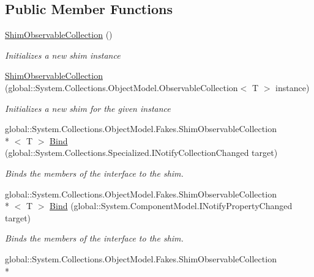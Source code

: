 \subsection*{Public Member Functions}
\begin{DoxyCompactItemize}
\item 
\hyperlink{class_system_1_1_collections_1_1_object_model_1_1_fakes_1_1_shim_observable_collection_3_01_t_01_4_ac24267859acea2bb73300f08bbcdd692}{Shim\-Observable\-Collection} ()
\begin{DoxyCompactList}\small\item\em Initializes a new shim instance\end{DoxyCompactList}\item 
\hyperlink{class_system_1_1_collections_1_1_object_model_1_1_fakes_1_1_shim_observable_collection_3_01_t_01_4_ad1fabf7b0c025f76d4309d0823675e1b}{Shim\-Observable\-Collection} (global\-::\-System.\-Collections.\-Object\-Model.\-Observable\-Collection$<$ T $>$ instance)
\begin{DoxyCompactList}\small\item\em Initializes a new shim for the given instance\end{DoxyCompactList}\item 
global\-::\-System.\-Collections.\-Object\-Model.\-Fakes.\-Shim\-Observable\-Collection\\*
$<$ T $>$ \hyperlink{class_system_1_1_collections_1_1_object_model_1_1_fakes_1_1_shim_observable_collection_3_01_t_01_4_ab09dd9abbef8fa816aa6effffb7b754e}{Bind} (global\-::\-System.\-Collections.\-Specialized.\-I\-Notify\-Collection\-Changed target)
\begin{DoxyCompactList}\small\item\em Binds the members of the interface to the shim.\end{DoxyCompactList}\item 
global\-::\-System.\-Collections.\-Object\-Model.\-Fakes.\-Shim\-Observable\-Collection\\*
$<$ T $>$ \hyperlink{class_system_1_1_collections_1_1_object_model_1_1_fakes_1_1_shim_observable_collection_3_01_t_01_4_aa47c7b90ccaaec89d8d0443cc40936d8}{Bind} (global\-::\-System.\-Component\-Model.\-I\-Notify\-Property\-Changed target)
\begin{DoxyCompactList}\small\item\em Binds the members of the interface to the shim.\end{DoxyCompactList}\item 
global\-::\-System.\-Collections.\-Object\-Model.\-Fakes.\-Shim\-Observable\-Collection\\*

\end{DoxyCompactItemize}
